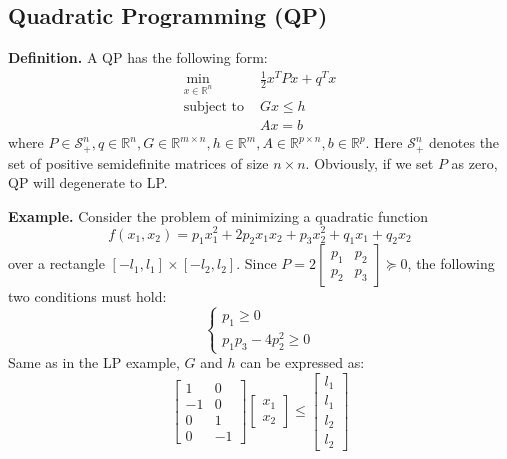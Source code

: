 \documentclass[
]{book}
\theoremstyle{definition}
\theoremstyle{definition}
\theoremstyle{definition}
\theoremstyle{definition}
\theoremstyle{remark}
\begin{document}
\hypertarget{quadratic-programming-qp}{%
\subsection{Quadratic Programming (QP)}\label{quadratic-programming-qp}}

\textbf{Definition.} A QP has the following form:
\begin{align}
   \label{eq:app-qpdef}
   \min_{x \in \mathbb{R}^n} \ & \frac{1}{2} x^T P x + q^T x \\
   \text{subject to } & Gx \le h \\
   & Ax = b
\end{align}
where \(P \in \mathcal{S}_+^n, q\in \mathbb{R}^n, G \in \mathbb{R}^{m \times n}, h\in \mathbb{R}^m, A \in \mathbb{R}^{p \times n}, b \in \mathbb{R}^p\). Here \(\mathcal{S}_+^n\) denotes the set of positive semidefinite matrices of size \(n\times n\). Obviously, if we set \(P\) as zero, QP will degenerate to LP.

\textbf{Example.} Consider the problem of minimizing a quadratic function
\begin{equation*}
   f(x_1, x_2) = p_1 x_1^2 + 2p_2 x_1 x_2 + p_3 x_2^2 + q_1 x_1 + q_2 x_2
\end{equation*}
over a rectangle \([-l_1, l_1] \times [-l_2, l_2]\). Since \(P = 2 \begin{bmatrix}  p_1 & p_2 \\ p_2 & p_3 \end{bmatrix} \succeq 0\), the following two conditions must hold:
\begin{equation*}
   \begin{cases}
      p_1 \ge 0 \\
      p_1 p_3 - 4 p_2^2 \ge 0
   \end{cases}
\end{equation*}
Same as in the LP example, \(G\) and \(h\) can be expressed as:
\begin{equation*}
   \begin{bmatrix}
      1 & 0 \\ -1 & 0 \\ 0 & 1 \\ 0 & -1
   \end{bmatrix} \begin{bmatrix}
      x_1 \\ x_2
   \end{bmatrix} \le \begin{bmatrix}
      l_1 \\ l_1 \\ l_2 \\ l_2
   \end{bmatrix}
\end{equation*}
\end{document}
